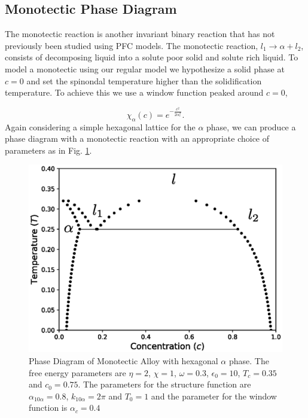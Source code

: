 \documentclass[showkeys, prb, reprint]{revtex4-1}
\newcommand{\f}{\frac}
\begin{document}
\subsection{Monotectic Phase Diagram}

The monotectic reaction is another invariant binary reaction that has not
previously been studied using PFC models. The monotectic reaction, $l_1
\rightarrow \alpha + l_2$, consists of decomposing liquid into a solute poor
solid and solute rich liquid. To model a monotectic using our regular model we
hypothesize a solid phase at $c=0$ and set the spinondal temperature higher
than the solidification temperature. To achieve this we use a window function
peaked around $c = 0$,

\begin{equation}
    \chi_\alpha(c) = e^{-\f{c^2}{2\alpha_c^2}}.
\end{equation}
Again considering a simple hexagonal lattice for the $\alpha$ phase, we can
produce a phase diagram with a monotectic reaction with an appropriate choice
of parameters as in Fig. \ref{monotectic}.

\begin{figure}
	\includegraphics[scale=0.5]{monotectic.eps}
	\caption{\label{monotectic} Phase Diagram of Monotectic Alloy with hexagonal $\alpha$ phase. The free energy parameters are $\eta = 2$, $\chi=1$, $\omega=0.3$, $\epsilon_0 = 10$, $T_c = 0.35$ and $c_0 = 0.75$. The parameters for the structure function are $\alpha_{10\alpha} = 0.8$, $k_{10\alpha} = 2\pi$ and $T_0 = 1$ and the parameter for the window function is $\alpha_c = 0.4$}
\end{figure}
\end{document}
